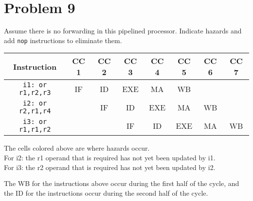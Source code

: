 \documentclass[10pt,letterpaper]{article}
\begin{document}
\section{Problem 9}
Assume there is no forwarding in this pipelined processor. Indicate hazards and add \texttt{nop} instructions to eliminate them.
\begin{center}\begin{tabular} { |c|c|c|c|c|c|c|c| }
\hline
Instruction & CC 1 & CC 2 & CC 3 & CC 4 & CC 5 & CC 6 & CC 7 \\
\hline
\texttt{i1: or r1,r2,r3} & IF & ID & EXE & MA & WB & & \\
\hline
\texttt{i2: or r2,r1,r4} & & IF & \cellcolor{blue!25}ID & EXE & MA & WB & \\
\hline
\texttt{i3: or r1,r1,r2} & & & IF & \cellcolor{blue!25}ID & EXE & MA & WB \\
\hline
\end{tabular}\end{center}
The cells colored above are where hazards occur.\\
For i2: the r1 operand that is required has not yet been updated by i1.\\
For i3: the r2 operand that is required has not yet been updated by i2.
\begin{center}
\end{center}
The WB for the instructions above occur during the first half of the cycle, and the ID for the instructions occur during the second half of the cycle.
\end{document}
